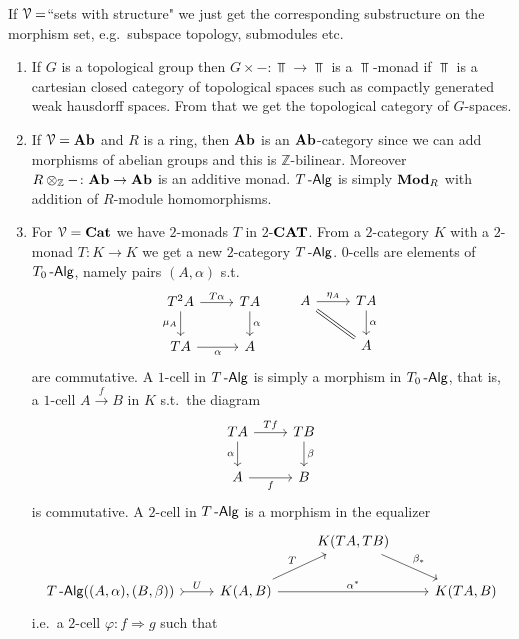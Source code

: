 \documentclass[a4paper,11pt,oneside,openany]{scrbook}
\begin{document}
\begin{exmp}
If $\operatorname{\mathcal{V}}=$``sets with structure" we just get the corresponding substructure on the morphism set, e.g.\ subspace topology, submodules etc.
\begin{enumerate}
    \item If $G$ is a topological group then $G\times-\colon\Top\to\Top$ is a $\Top$-monad if $\Top$ is a cartesian closed category of topological spaces such as compactly generated weak hausdorff spaces. From that we get the topological category of $G$-spaces. 
    \item If $\operatorname{\mathcal{V}}={\normalfont\textbf{Ab}}$ and $R$ is a ring, then ${\normalfont\textbf{Ab}}$ is an ${\normalfont\textbf{Ab}}$-category since we can add morphisms of abelian groups and this is $\mathbb{Z}$-bilinear. Moreover $R\otimes_\mathbb{Z}-\colon{\normalfont\textbf{Ab}}\to{\normalfont\textbf{Ab}}$ is an additive monad. $T\operatorname{-\mathsf{Alg}}$ is simply ${\normalfont\textbf{Mod}}_R$ with addition of $R$-module homomorphisms. 
    \item For $\operatorname{\mathcal{V}}={\normalfont\textbf{Cat}}$ we have $2$-monads $T$ in $2$-${\normalfont\textbf{CAT}}$. From a $2$-category $K$ with a $2$-monad $T\colon K\to K$ we get a new $2$-category $T\operatorname{-\mathsf{Alg}}$.
    $0$-cells are elements of $T_0\operatorname{-\mathsf{Alg}}$, namely pairs $(A,\alpha)$ s.t.
    \[	
			\begin{tikzcd}
				T^2 A\ar["\mu_{A}"']{d}\ar["T\alpha"]{r}
				& TA\ar["\alpha"]{d} \\
				TA\ar["\alpha"']{r}
				& A
			\end{tikzcd}
			\quad\quad
			\begin{tikzcd}
				A\ar[equal, swap]{dr}\ar["\eta_{A}"]{r}
				& TA\ar["\alpha"]{d} \\
				& A
			\end{tikzcd}
		\]
		are commutative.
A $1$-cell in $T\operatorname{-\mathsf{Alg}}$ is simply a morphism in $T_0\operatorname{-\mathsf{Alg}}$, that is, a $1$-cell $A\xrightarrow{f}B$ in $K$ s.t.\ the diagram
	\[
	\begin{tikzcd}
	TA\arrow[d, "\alpha"']\arrow["Tf"]{r}
	& TB\arrow[d, "\beta"]\\
	A\arrow["f"']{r}
	& B
	\end{tikzcd}
	\]
is commutative. A $2$-cell in $T\operatorname{-\mathsf{Alg}}$ is a morphism in the equalizer
\[
\begin{tikzcd}
&& K(TA,TB) \arrow[rd, "\beta_*"] &  \\
T\Alg((A,\alpha),(B,\beta)) \arrow[r, tail, "U"] & K(A,B) \arrow[rr, "\alpha^*"] \arrow[ru, "T"] &             & K(TA,B)
\end{tikzcd}
\]
i.e.\ a $2$-cell $\varphi\colon f\Rightarrow g$ such that
\[
    \begin{minipage}{0.3\linewidth}
        \begin{tikzcd}[row sep=1cm, column sep=1cm]

\end{tikzcd}
\end{minipage}\]
\end{enumerate}
\end{exmp}
\end{document}
